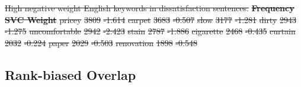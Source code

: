 \documentclass[smallextended,natbib]{svjour3}       %
\providecommand{\DIFdel}[1]{{\protect\color{red}\sout{#1}}}                      %
\providecommand{\DIFdelend}{} %
\providecommand{\DIFdelFL}[1]{\DIFdel{#1}} %
\DeclareRobustCommand{\DIFdelend}{\DIFOaddend \let\includegraphics\DIFOincludegraphics} %
\begin{document}
{%
\DIFdelFL{High negative weight English keywords in dissatisfaction sentences.}}
\textbf{\DIFdelFL{Frequency}} %
\textbf{\DIFdelFL{SVC Weight}} %
\DIFdelFL{pricey }%
\DIFdelFL{3809 }%
\DIFdelFL{-1.614 }%
\DIFdelFL{carpet }%
\DIFdelFL{3683 }%
\DIFdelFL{-0.507 }%
\DIFdelFL{slow }%
\DIFdelFL{3177 }%
\DIFdelFL{-1.281 }%
\DIFdelFL{dirty }%
\DIFdelFL{2943 }%
\DIFdelFL{-1.275 }%
\DIFdelFL{uncomfortable }%
\DIFdelFL{2942 }%
\DIFdelFL{-2.423 }%
\DIFdelFL{stain }%
\DIFdelFL{2787 }%
\DIFdelFL{-1.886 }%
\DIFdelFL{cigarette }%
\DIFdelFL{2468 }%
\DIFdelFL{-0.435 }%
\DIFdelFL{curtain }%
\DIFdelFL{2032 }%
\DIFdelFL{-0.224 }%
\DIFdelFL{paper }%
\DIFdelFL{2029 }%
\DIFdelFL{-0.503 }%
\DIFdelFL{renovation }%
\DIFdelFL{1898 }%
\DIFdelFL{-0.548 }%

\DIFdelend \subsection{Rank-biased Overlap}\label{rboresults}
\end{document}
